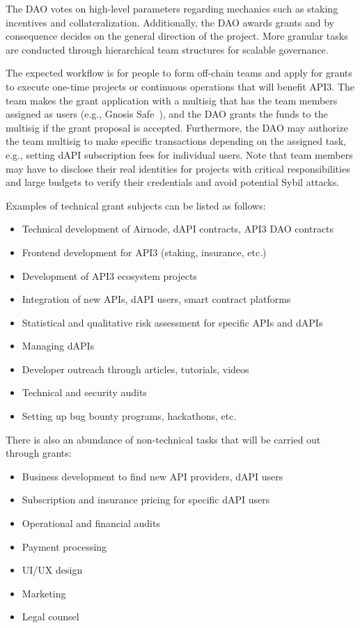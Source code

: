 \documentclass[11pt]{article}
\begin{document}
The DAO votes on high-level parameters regarding mechanics such as staking incentives and collateralization.
Additionally, the DAO awards grants and by consequence decides on the general direction of the project.
More granular tasks are conducted through hierarchical team structures for scalable governance.

The expected workflow is for people to form off-chain teams and apply for grants to execute one-time projects or continuous operations that will benefit API3.
The team makes the grant application with a multisig that has the team members assigned as users (e.g., Gnosis Safe~\cite{gnosis}), and the DAO grants the funds to the multisig if the grant proposal is accepted.
Furthermore, the DAO may authorize the team multisig to make specific transactions depending on the assigned task, e.g., setting dAPI subscription fees for individual users.
Note that team members may have to disclose their real identities for projects with critical responsibilities and large budgets to verify their credentials and avoid potential Sybil attacks.

Examples of technical grant subjects can be listed as follows:
\begin{itemize}
    \item Technical development of Airnode, dAPI contracts, API3 DAO contracts
    \item Frontend development for API3 (staking, insurance, etc.)
    \item Development of API3 ecosystem projects
    \item Integration of new APIs, dAPI users, smart contract platforms
    \item Statistical and qualitative risk assessment for specific APIs and dAPIs
    \item Managing dAPIs
    \item Developer outreach through articles, tutorials, videos
    \item Technical and security audits
    \item Setting up bug bounty programs, hackathons, etc.
\end{itemize}

There is also an abundance of non-technical tasks that will be carried out through grants:
\begin{itemize}
    \item Business development to find new API providers, dAPI users
    \item Subscription and insurance pricing for specific dAPI users
    \item Operational and financial audits
    \item Payment processing
    \item UI/UX design
    \item Marketing
    \item Legal counsel
\end{itemize}
\end{document}

